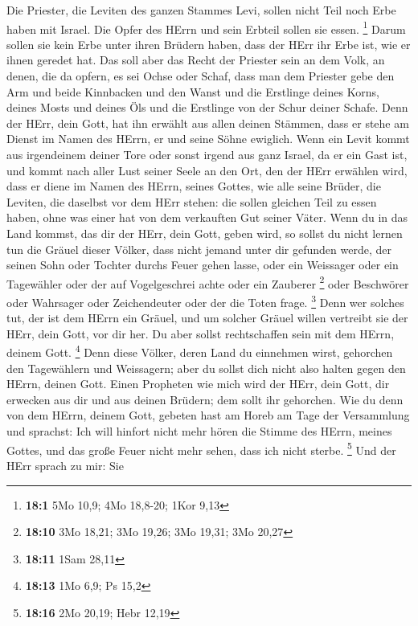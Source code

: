 Die Priester, die Leviten des ganzen Stammes Levi, sollen
nicht Teil noch Erbe haben mit Israel. Die Opfer des HErrn und sein
Erbteil sollen sie essen. \footnote{\textbf{18:1} 5Mo 10,9; 4Mo 18,8-20;
  1Kor 9,13}  Darum sollen sie kein Erbe unter ihren
Brüdern haben, dass der HErr ihr Erbe ist, wie er ihnen geredet hat.
 Das soll aber das Recht der Priester sein an dem Volk, an
denen, die da opfern, es sei Ochse oder Schaf, dass man dem Priester
gebe den Arm und beide Kinnbacken und den Wanst  und die
Erstlinge deines Korns, deines Mosts und deines Öls und die Erstlinge
von der Schur deiner Schafe.  Denn der HErr, dein Gott,
hat ihn erwählt aus allen deinen Stämmen, dass er stehe am Dienst im
Namen des HErrn, er und seine Söhne ewiglich.  Wenn ein
Levit kommt aus irgendeinem deiner Tore oder sonst irgend aus ganz
Israel, da er ein Gast ist, und kommt nach aller Lust seiner Seele an
den Ort, den der HErr erwählen wird,  dass er diene im
Namen des HErrn, seines Gottes, wie alle seine Brüder, die Leviten, die
daselbst vor dem HErr stehen:  die sollen gleichen Teil zu
essen haben, ohne was einer hat von dem verkauften Gut seiner Väter.
 Wenn du in das Land kommst, das dir der HErr, dein Gott,
geben wird, so sollst du nicht lernen tun die Gräuel dieser Völker,
 dass nicht jemand unter dir gefunden werde, der seinen
Sohn oder Tochter durchs Feuer gehen lasse, oder ein Weissager oder ein
Tagewähler oder der auf Vogelgeschrei achte oder ein Zauberer
\footnote{\textbf{18:10} 3Mo 18,21; 3Mo 19,26; 3Mo 19,31; 3Mo 20,27}
 oder Beschwörer oder Wahrsager oder Zeichendeuter oder
der die Toten frage. \footnote{\textbf{18:11} 1Sam 28,11}
 Denn wer solches tut, der ist dem HErrn ein Gräuel, und
um solcher Gräuel willen vertreibt sie der HErr, dein Gott, vor dir her.
 Du aber sollst rechtschaffen sein mit dem HErrn, deinem
Gott. \footnote{\textbf{18:13} 1Mo 6,9; Ps 15,2}  Denn
diese Völker, deren Land du einnehmen wirst, gehorchen den Tagewählern
und Weissagern; aber du sollst dich nicht also halten gegen den HErrn,
deinen Gott.  Einen Propheten wie mich wird der HErr,
dein Gott, dir erwecken aus dir und aus deinen Brüdern; dem sollt ihr
gehorchen.  Wie du denn von dem HErrn, deinem Gott,
gebeten hast am Horeb am Tage der Versammlung und sprachst: Ich will
hinfort nicht mehr hören die Stimme des HErrn, meines Gottes, und das
große Feuer nicht mehr sehen, dass ich nicht sterbe. \footnote{\textbf{18:16}
  2Mo 20,19; Hebr 12,19}  Und der HErr sprach zu mir: Sie
